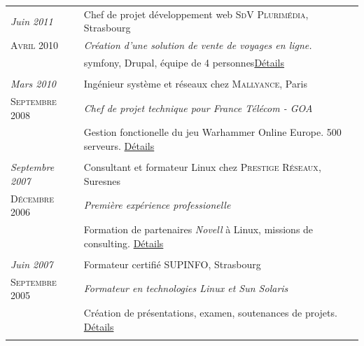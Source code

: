 \documentclass[a4paper,10pt]{article}
\begin{document}
\begin{tabular}{p{}|p{}}
\emph{Juin 2011} & Chef de projet développement web \textsc{SdV Plurimédia}, Strasbourg \\\textsc{Avril 2010}&\emph{Création d'une solution de vente de voyages en ligne.}\\&\footnotesize{symfony, Drupal, équipe de 4 personnes\hyperlink{sdv}{\hfill \footnotesize Détails}}\\\multicolumn{2}{c}{} \\
  
 \emph{Mars 2010} & Ingénieur système et réseaux chez \textsc{Mallyance}, Paris \\\textsc{Septembre 2008}&\emph{Chef de projet technique pour France Télécom - GOA}\\&\footnotesize{Gestion fonctionelle du jeu Warhammer Online Europe. 500 serveurs. \hyperlink{mallyance}{\hfill \footnotesize Détails}}\\\multicolumn{2}{c}{} \\

 \emph{Septembre 2007} & Consultant et formateur Linux chez \textsc{Prestige Réseaux}, Suresnes \\\textsc{Décembre 2006}&\emph{Première expérience professionelle}\\&\footnotesize{Formation de partenaires \emph{Novell} à Linux, missions de consulting. \hyperlink{prestige}{\hfill \footnotesize Détails}}\\\multicolumn{2}{c}{} \\

 \emph{Juin 2007} & Formateur certifié \textsc{SUPINFO}, Strasbourg \\\textsc{Septembre 2005}&\emph{Formateur en technologies Linux et Sun Solaris}\\&\footnotesize{Création de présentations, examen, soutenances de projets. \hyperlink{supinfo}{\hfill \footnotesize Détails}}\\\multicolumn{2}{c}{}
\end{tabular}
\end{document}
